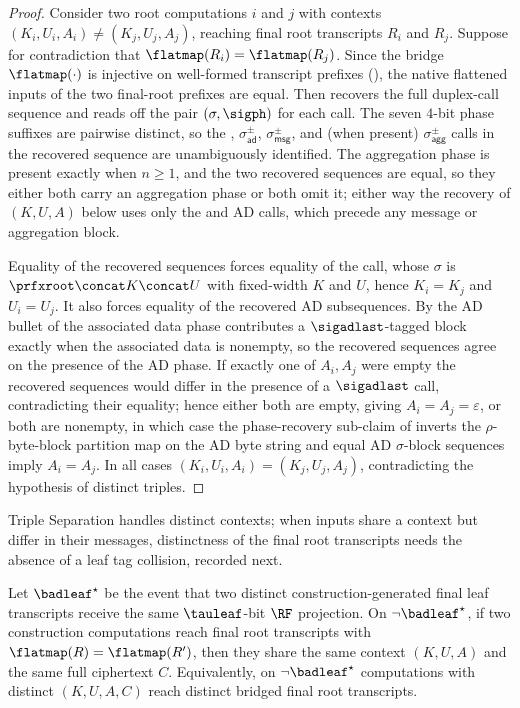 \begin{proof}
Consider two root computations $i$ and $j$ with contexts
$(K_i, U_i, A_i) \neq (K_j, U_j, A_j)$, reaching final root transcripts
$R_i$ and $R_j$. Suppose for contradiction that
$\flatmap(R_i) = \flatmap(R_j)$. Since the
bridge $\flatmap(\cdot)$ is injective on well-formed transcript prefixes
(), the native flattened inputs of the two
final-root prefixes are equal. Then 
recovers the full duplex-call sequence and reads off the pair
$(\sigma,\sigph)$ for each call. The seven $4$-bit phase suffixes are
pairwise distinct, so the \siginit, $\sigma_{\mathsf{ad}}^\pm$,
$\sigma_{\mathsf{msg}}^\pm$, and (when present) $\sigma_{\mathsf{agg}}^\pm$
calls in the recovered sequence are unambiguously identified. The
aggregation phase is present exactly when $n \geq 1$, and the two
recovered sequences are equal, so they either both carry an aggregation
phase or both omit it; either way the recovery of $(K, U, A)$ below uses only the
\siginit and AD calls, which precede any message or aggregation block.

Equality of the recovered sequences forces equality of the \siginit
call, whose $\sigma$ is $\prfxroot \concat K \concat U$ with
fixed-width $K$ and $U$, hence $K_i = K_j$ and $U_i = U_j$. It also
forces equality of the recovered AD subsequences. By the AD bullet of
 the associated data phase contributes a
$\sigadlast$-tagged block exactly when the associated data is nonempty,
so the recovered sequences agree on the presence of the AD phase. If
exactly one of $A_i, A_j$ were empty the recovered sequences would
differ in the presence of a $\sigadlast$ call, contradicting their
equality; hence either both are empty, giving $A_i = A_j = \varepsilon$,
or both are nonempty, in which case the phase-recovery sub-claim of
 inverts the $\rho$-byte-block partition map on
the AD byte string and equal AD $\sigma$-block sequences imply
$A_i = A_j$. In all cases $(K_i, U_i, A_i) = (K_j, U_j, A_j)$,
contradicting the hypothesis of distinct triples.
\end{proof}

Triple Separation handles distinct contexts; when inputs share a context
but differ in their messages, distinctness of the final root transcripts
needs the absence of a leaf tag collision, recorded next.

\begin{proposition}
\label{prop:final-root-sep}
Let $\badleaf^\star$ be the event that two distinct construction-generated
final leaf transcripts receive the same $\tauleaf$-bit $\RF$ projection.
On $\neg\badleaf^\star$, if two \TW{} construction computations reach
final root transcripts with $\flatmap(R) = \flatmap(R')$, then they share
the same context $(K, U, A)$ and the same full ciphertext $C$.
Equivalently, on $\neg\badleaf^\star$ computations with distinct
$(K, U, A, C)$ reach distinct bridged final root transcripts.
\end{proposition}

